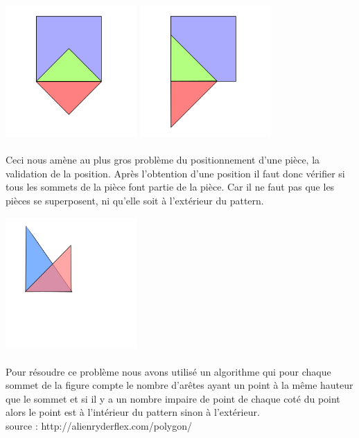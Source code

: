 \documentclass{report}
\begin{document}
    \begin{center}
    \includegraphics[width=5cm]{place_figure_probleme_symetrie_1}
    \includegraphics[width=5cm]{place_figure_probleme_symetrie_2}
    \end{center}

    \paragraph{}Ceci nous amène au plus gros problème du positionnement d'une pièce, la validation
    de la position. Après l'obtention d'une position il faut donc vérifier si tous les sommets de la
    pièce font partie de la pièce. Car il ne faut pas que les pièces se superposent, ni qu'elle soit
    à l'extérieur du pattern.

    \begin{center}
    \includegraphics[width=5cm]{place_figure_probleme_point}
    \end{center}

    \paragraph{} Pour résoudre ce problème nous avons utilisé un algorithme qui pour chaque sommet
    de la figure compte le nombre d'arêtes ayant un point à la même hauteur que le sommet et si il y
    a un nombre impaire de point de chaque coté du point alors le point est à l'intérieur du pattern
    sinon à l'extérieur.
    \\ source : http://alienryderflex.com/polygon/
\end{document}
